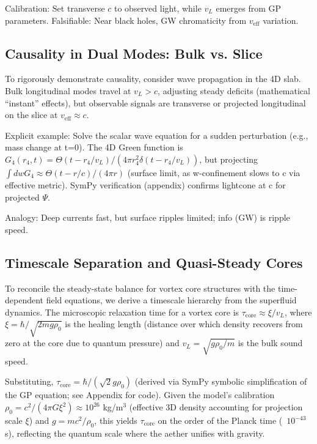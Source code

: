 \documentclass{article}
\begin{document}
Calibration: Set transverse $c$ to observed light, while $v_L$ emerges from GP parameters. Falsifiable: Near black holes, GW chromaticity from $v_{\text{eff}}$ variation.

\subsection{Causality in Dual Modes: Bulk vs. Slice}

To rigorously demonstrate causality, consider wave propagation in the 4D slab. Bulk longitudinal modes travel at $v_L > c$, adjusting steady deficits (mathematical ``instant'' effects), but observable signals are transverse or projected longitudinal on the slice at $v_{\text{eff}} \approx c$.

Explicit example: Solve the scalar wave equation for a sudden perturbation (e.g., mass change at t=0). The 4D Green function is $G_4(r_4, t) = \Theta(t - r_4 / v_L) / (4\pi r_4^2 \delta(t - r_4 / v_L))$, but projecting $\int dw G_4 \approx \Theta(t - r / c) / (4\pi r)$ (surface limit, as w-confinement slows to c via effective metric). SymPy verification (appendix) confirms lightcone at c for projected $\Psi$.

Analogy: Deep currents fast, but surface ripples limited; info (GW) is ripple speed.

\subsection{Timescale Separation and Quasi-Steady Cores}

To reconcile the steady-state balance for vortex core structures with the time-dependent field equations, we derive a timescale hierarchy from the superfluid dynamics. The microscopic relaxation time for a vortex core is $\tau_{\text{core}} \approx \xi / v_L$, where $\xi = \hbar / \sqrt{2 m g \rho_0}$ is the healing length (distance over which density recovers from zero at the core due to quantum pressure) and $v_L = \sqrt{g \rho_0 / m}$ is the bulk sound speed.

Substituting, $\tau_{\text{core}} = \hbar / (\sqrt{2} g \rho_0)$ (derived via SymPy symbolic simplification of the GP equation; see Appendix for code). Given the model's calibration $\rho_0 = c^2 / (4\pi G \xi^2) \approx 10^{26}$ kg/m$^3$ (effective 3D density accounting for projection scale $\xi$) and $g = m c^2 / \rho_0$, this yields $\tau_{\text{core}}$ on the order of the Planck time (~$10^{-43}$ s), reflecting the quantum scale where the aether unifies with gravity.
\end{document}
